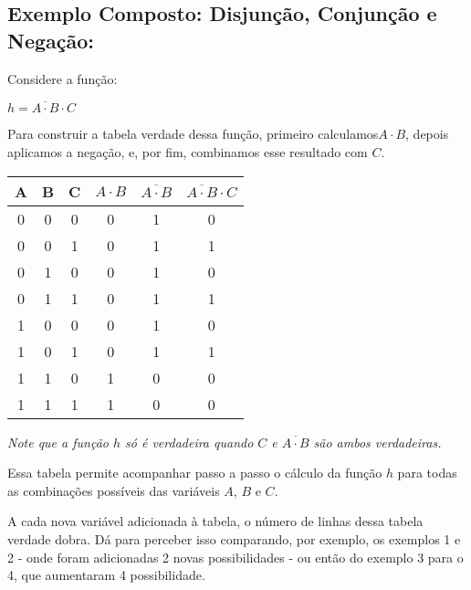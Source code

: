 \documentclass[12pt]{article}
\begin{document}
\subsection*{Exemplo Composto: Disjunção, Conjunção e Negação:}
Considere a função:
\begin{center}
$h = \overline{A \cdot B} \cdot C$
\end{center}
Para construir a tabela verdade dessa função, primeiro calculamos\( A \cdot B\), depois aplicamos a negação, e, por fim, combinamos esse resultado com \( C \).

\begin{center}
\begin{minipage}{0.44\textwidth}
\begin{tabular}{|c|c|c|c|c|c|}
\hline
A & B & C & \( A \cdot B \) & \( \overline{A \cdot B} \) & \( \overline{A \cdot B} \cdot C \) \\
\hline
0 & 0 & 0 & 0 & 1 & 0 \\
0 & 0 & 1 & 0 & 1 & 1 \\
0 & 1 & 0 & 0 & 1 & 0 \\
0 & 1 & 1 & 0 & 1 & 1 \\
1 & 0 & 0 & 0 & 1 & 0 \\
1 & 0 & 1 & 0 & 1 & 1 \\
1 & 1 & 0 & 1 & 0 & 0 \\
1 & 1 & 1 & 1 & 0 & 0 \\
\hline
\end{tabular}
\end{minipage}%
\hspace{1em}%
\begin{minipage}{0.2\textwidth}
   \vspace{1em}
   \textit{Note que a função $h$ só é verdadeira quando $C$ e $\overline{A \cdot B}$ são ambos verdadeiras.}
\end{minipage}
\end{center}

Essa tabela permite acompanhar passo a passo o cálculo da função \( h \) para todas as combinações possíveis das variáveis \( A \), \( B \) e \( C \).

\begin{tcolorbox}[mynote, title= Observação: números de linhas da Tabela Verdade]
A cada nova variável adicionada à tabela, o número de linhas dessa tabela verdade dobra. Dá para perceber isso comparando, por exemplo, os exemplos 1 e 2 - onde foram adicionadas 2 novas possibilidades - ou então do exemplo 3 para o 4, que aumentaram 4 possibilidade.  
\end{tcolorbox}
\end{document}
